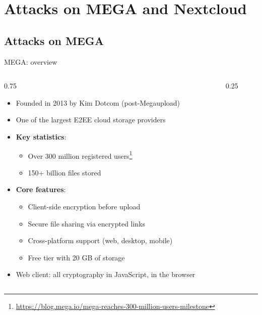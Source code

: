 \ifdefined\PRESENTATION\else\PassOptionsToClass{handout}{beamer}\fi\documentclass[aspectratio=169, lualatex]{beamer}
\begin{document}
\section{Attacks on MEGA and Nextcloud}

\subsection{Attacks on MEGA}

\begin{frame}{MEGA: overview}
	\begin{columns}[c]
		\begin{column}{0.75\textwidth}
			\begin{itemize}
				\item Founded in 2013 by Kim Dotcom (post-Megaupload)
				\item One of the largest E2EE cloud storage providers
				\item \textbf{Key statistics}:
				      \begin{itemize}
					      \item Over 300 million registered users\footnote{\url{https://blog.mega.io/mega-reaches-300-million-users-milestone}}
					      \item 150+ billion files stored
				      \end{itemize}
				\item \textbf{Core features}:
				      \begin{itemize}
					      \item Client-side encryption before upload
					      \item Secure file sharing via encrypted links
					      \item Cross-platform support (web, desktop, mobile)
					      \item Free tier with 20 GB of storage
				      \end{itemize}
				\item Web client: all cryptography in JavaScript, in the browser
			\end{itemize}
		\end{column}
		\begin{column}{0.25\textwidth}
		\end{column}
	\end{columns}
\end{frame}
\end{document}
